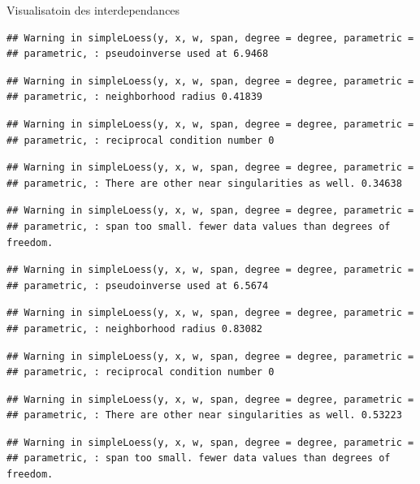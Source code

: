 \documentclass[11pt,ignorenonframetext,]{beamer}
\begin{document}
\begin{frame}[fragile]{Visualisatoin des interdependances}
\begin{verbatim}
## Warning in simpleLoess(y, x, w, span, degree = degree, parametric =
## parametric, : pseudoinverse used at 6.9468
\end{verbatim}

\begin{verbatim}
## Warning in simpleLoess(y, x, w, span, degree = degree, parametric =
## parametric, : neighborhood radius 0.41839
\end{verbatim}

\begin{verbatim}
## Warning in simpleLoess(y, x, w, span, degree = degree, parametric =
## parametric, : reciprocal condition number 0
\end{verbatim}

\begin{verbatim}
## Warning in simpleLoess(y, x, w, span, degree = degree, parametric =
## parametric, : There are other near singularities as well. 0.34638
\end{verbatim}

\begin{verbatim}
## Warning in simpleLoess(y, x, w, span, degree = degree, parametric =
## parametric, : span too small. fewer data values than degrees of freedom.
\end{verbatim}

\begin{verbatim}
## Warning in simpleLoess(y, x, w, span, degree = degree, parametric =
## parametric, : pseudoinverse used at 6.5674
\end{verbatim}

\begin{verbatim}
## Warning in simpleLoess(y, x, w, span, degree = degree, parametric =
## parametric, : neighborhood radius 0.83082
\end{verbatim}

\begin{verbatim}
## Warning in simpleLoess(y, x, w, span, degree = degree, parametric =
## parametric, : reciprocal condition number 0
\end{verbatim}

\begin{verbatim}
## Warning in simpleLoess(y, x, w, span, degree = degree, parametric =
## parametric, : There are other near singularities as well. 0.53223
\end{verbatim}

\begin{verbatim}
## Warning in simpleLoess(y, x, w, span, degree = degree, parametric =
## parametric, : span too small. fewer data values than degrees of freedom.
\end{verbatim}


\end{frame}
\end{document}
